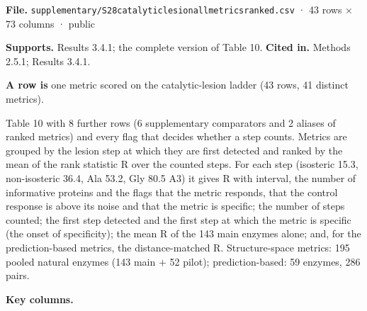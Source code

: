 \documentclass[
  10pt,
]{article}
\DeclareRobustCommand{\_}{\textunderscore\hspace{0pt}}
\begin{document}
\begin{shaded}\small

\textbf{File.}
\texttt{supplementary/S28\_catalytic\_lesion\_all\_metrics\_ranked.csv}
· 43 rows × 73
columns · public

\textbf{Supports.}
Results 3.4.1; the
complete version of
Table 10.
\textbf{Cited in.}
Methods 2.5.1;
Results 3.4.1.

\textbf{A row is}
one metric scored on
the catalytic-lesion
ladder (43 rows, 41
distinct metrics).

\end{shaded}

Table 10 with 8
further rows (6
supplementary
comparators and 2
aliases of ranked
metrics) and every
flag that decides
whether a step
counts. Metrics are
grouped by the
lesion step at which
they are first
detected and ranked
by the mean of the
rank statistic R
over the counted
steps. For each step
(isosteric 15.3,
non-isosteric 36.4,
Ala 53.2, Gly 80.5
A3) it gives R with
interval, the number
of informative
proteins and the
flags that the
metric responds,
that the control
response is above
its noise and that
the metric is
specific; the number
of steps counted;
the first step
detected and the
first step at which
the metric is
specific (the onset
of specificity); the
mean R of the 143
main enzymes alone;
and, for the
prediction-based
metrics, the
distance-matched R.
Structure-space
metrics: 195 pooled
natural enzymes (143
main + 52 pilot);
prediction-based: 59
enzymes, 286 pairs.

\textbf{Key
columns.}
\end{document}
